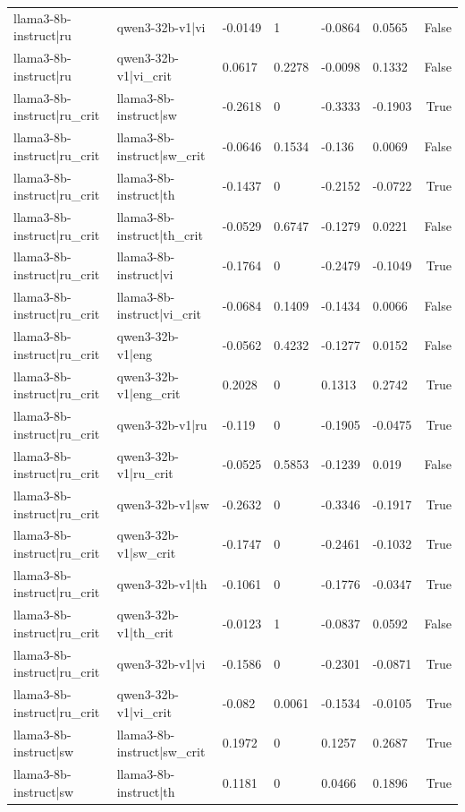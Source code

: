 \begin{table}
\begin{tabular}{llllllr}
llama3-8b-instruct|ru & qwen3-32b-v1|vi & -0.0149 & 1 & -0.0864 & 0.0565 & False \\
llama3-8b-instruct|ru & qwen3-32b-v1|vi_crit & 0.0617 & 0.2278 & -0.0098 & 0.1332 & False \\
llama3-8b-instruct|ru_crit & llama3-8b-instruct|sw & -0.2618 & 0 & -0.3333 & -0.1903 & True \\
llama3-8b-instruct|ru_crit & llama3-8b-instruct|sw_crit & -0.0646 & 0.1534 & -0.136 & 0.0069 & False \\
llama3-8b-instruct|ru_crit & llama3-8b-instruct|th & -0.1437 & 0 & -0.2152 & -0.0722 & True \\
llama3-8b-instruct|ru_crit & llama3-8b-instruct|th_crit & -0.0529 & 0.6747 & -0.1279 & 0.0221 & False \\
llama3-8b-instruct|ru_crit & llama3-8b-instruct|vi & -0.1764 & 0 & -0.2479 & -0.1049 & True \\
llama3-8b-instruct|ru_crit & llama3-8b-instruct|vi_crit & -0.0684 & 0.1409 & -0.1434 & 0.0066 & False \\
llama3-8b-instruct|ru_crit & qwen3-32b-v1|eng & -0.0562 & 0.4232 & -0.1277 & 0.0152 & False \\
llama3-8b-instruct|ru_crit & qwen3-32b-v1|eng_crit & 0.2028 & 0 & 0.1313 & 0.2742 & True \\
llama3-8b-instruct|ru_crit & qwen3-32b-v1|ru & -0.119 & 0 & -0.1905 & -0.0475 & True \\
llama3-8b-instruct|ru_crit & qwen3-32b-v1|ru_crit & -0.0525 & 0.5853 & -0.1239 & 0.019 & False \\
llama3-8b-instruct|ru_crit & qwen3-32b-v1|sw & -0.2632 & 0 & -0.3346 & -0.1917 & True \\
llama3-8b-instruct|ru_crit & qwen3-32b-v1|sw_crit & -0.1747 & 0 & -0.2461 & -0.1032 & True \\
llama3-8b-instruct|ru_crit & qwen3-32b-v1|th & -0.1061 & 0 & -0.1776 & -0.0347 & True \\
llama3-8b-instruct|ru_crit & qwen3-32b-v1|th_crit & -0.0123 & 1 & -0.0837 & 0.0592 & False \\
llama3-8b-instruct|ru_crit & qwen3-32b-v1|vi & -0.1586 & 0 & -0.2301 & -0.0871 & True \\
llama3-8b-instruct|ru_crit & qwen3-32b-v1|vi_crit & -0.082 & 0.0061 & -0.1534 & -0.0105 & True \\
llama3-8b-instruct|sw & llama3-8b-instruct|sw_crit & 0.1972 & 0 & 0.1257 & 0.2687 & True \\
llama3-8b-instruct|sw & llama3-8b-instruct|th & 0.1181 & 0 & 0.0466 & 0.1896 & True \\

\end{tabular}
\end{table}
